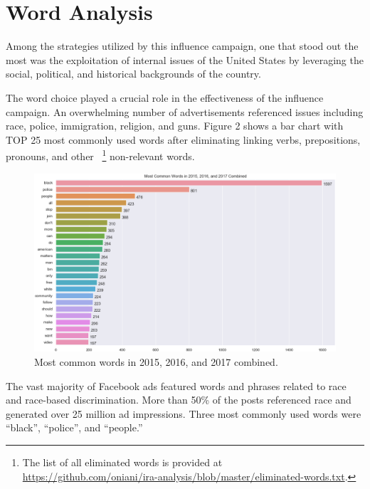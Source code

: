 \documentclass{article}
\begin{document}

\section{Word Analysis}

Among the strategies utilized by this influence campaign, one that stood out
the most was the exploitation of internal issues of the United States by
leveraging the social, political, and historical backgrounds of the country.

\medskip

The word choice played a crucial role in the effectiveness of the influence
campaign. An overwhelming number of advertisements referenced issues including
race, police, immigration, religion, and guns. Figure 2 shows a bar chart with
TOP 25 most commonly used words after eliminating linking verbs, prepositions,
pronouns, and other
~\footnote{The list of all eliminated words is provided at\\
\url{https://github.com/oniani/ira-analysis/blob/master/eliminated-words.txt}.}
non-relevant words.

\begin{figure}[H]
\centering
\includegraphics[width=\linewidth]{./image/barchart-plots/barchart_word_counts.png}
\caption{Most common words in 2015, 2016, and 2017 combined.}
\end{figure}

The vast majority of Facebook ads featured words and phrases related to race
and race-based discrimination. More than 50\% of the posts referenced race and
generated over 25 million ad impressions. Three most commonly used words were
``black'', ``police'', and ``people.''
\end{document}
